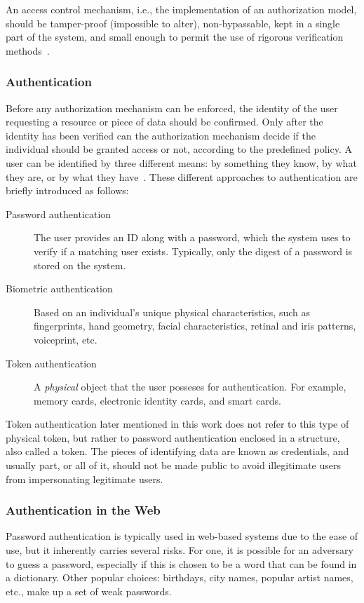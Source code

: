 \documentclass[12pt]{article}
\begin{document}
An access control mechanism, i.e., the implementation of an authorization model, should be tamper-proof (impossible to alter), non-bypassable, kept in a single part of the system, and small enough to permit the use of rigorous verification methods~\cite{access_02}.

\subsubsection{Authentication}

Before any authorization mechanism can be enforced, the identity of the user requesting a resource or piece of data should be confirmed. Only after the identity has been verified can the authorization mechanism decide if the individual should be granted access or not, according to the predefined policy. A user can be identified by three different means: by something they know, by what they are, or by what they have~\cite{stallings_01}. These different approaches to authentication are briefly introduced as follows:

\begin{description}
\item[Password authentication] The user provides an ID along with a password, which the system uses to verify if a matching user exists. Typically, only the digest of a password is stored on the system. 
\item[Biometric authentication] Based on an individual's unique physical characteristics, such as fingerprints, hand geometry, facial characteristics, retinal and iris patterns, voiceprint, etc. 
\item[Token authentication] A \emph{physical} object that the user posseses for authentication. For example, memory cards, electronic identity cards, and smart cards. 
\end{description}

Token authentication later mentioned in this work does not refer to this type of physical token, but rather to password authentication enclosed in a structure, also called a token.
The pieces of identifying data are known as credentials, and usually part, or all of it, should not be made public to avoid illegitimate users from impersonating legitimate users.

\subsubsection{Authentication in the Web}

Password authentication is typically used in web-based systems due to the ease of use, but it inherently carries several risks. For one, it is possible for an adversary to guess a password, especially if this is chosen to be a word that can be found in a dictionary. Other popular choices: birthdays, city names, popular artist names, etc., make up a set of weak passwords.
\end{document}
